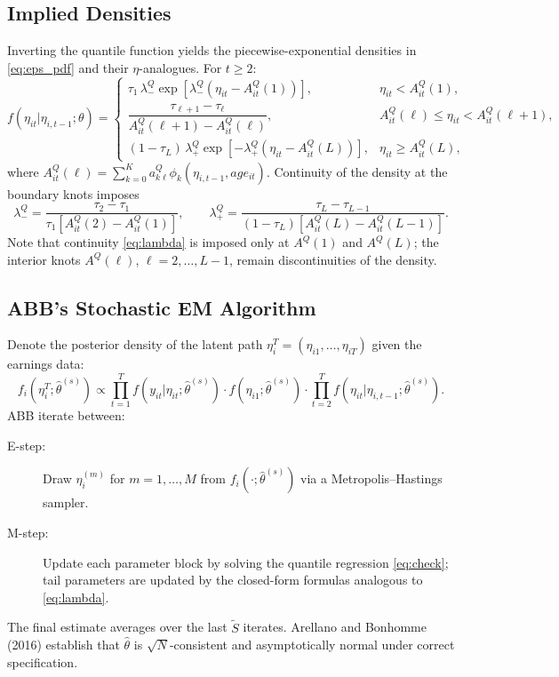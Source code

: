 \documentclass[12pt]{article}
\begin{document}
\subsection{Implied Densities}

Inverting the quantile function yields the piecewise-exponential densities
in \eqref{eq:eps_pdf} and their $\eta$-analogues.
For $t\ge2$:
\begin{equation}\label{eq:eta_pdf}
f(\eta_{it}|\eta_{i,t-1};\theta)=\begin{cases}
\tau_1\,\lambda_-^Q\exp[\lambda_-^Q(\eta_{it}-A^Q_{it}(1))],
  & \eta_{it}<A^Q_{it}(1),\\[4pt]
\dfrac{\tau_{\ell+1}-\tau_\ell}{A^Q_{it}(\ell+1)-A^Q_{it}(\ell)},
  & A^Q_{it}(\ell)\le\eta_{it}<A^Q_{it}(\ell+1),\\[4pt]
(1-\tau_L)\,\lambda_+^Q\exp[-\lambda_+^Q(\eta_{it}-A^Q_{it}(L))],
  & \eta_{it}\ge A^Q_{it}(L),
\end{cases}
\end{equation}
where $A^Q_{it}(\ell)=\sum_{k=0}^K a_{k\ell}^Q\phi_k(\eta_{i,t-1},age_{it})$.
Continuity of the density at the boundary knots imposes
\begin{equation}\label{eq:lambda}
\lambda_-^Q=\frac{\tau_2-\tau_1}{\tau_1[A^Q_{it}(2)-A^Q_{it}(1)]},\qquad
\lambda_+^Q=\frac{\tau_L-\tau_{L-1}}{(1-\tau_L)[A^Q_{it}(L)-A^Q_{it}(L-1)]}.
\end{equation}
Note that continuity \eqref{eq:lambda} is imposed only at $A^Q(1)$ and
$A^Q(L)$; the interior knots $A^Q(\ell)$, $\ell=2,\ldots,L-1$, remain
discontinuities of the density.

\subsection{ABB's Stochastic EM Algorithm}

Denote the posterior density of the latent path $\eta_i^T=(\eta_{i1},\ldots,\eta_{iT})$ given the earnings data:
\begin{equation}
f_i(\eta_i^T;\hat\theta^{(s)})\propto
\prod_{t=1}^T f(y_{it}|\eta_{it};\hat\theta^{(s)})\cdot
f(\eta_{i1};\hat\theta^{(s)})\cdot
\prod_{t=2}^T f(\eta_{it}|\eta_{i,t-1};\hat\theta^{(s)}).
\end{equation}
ABB iterate between:
\begin{description}
\item[E-step:] Draw $\eta_i^{(m)}$ for $m=1,\ldots,M$ from
  $f_i(\cdot;\hat\theta^{(s)})$ via a Metropolis--Hastings sampler.
\item[M-step:] Update each parameter block by solving the quantile regression
  \eqref{eq:check}; tail parameters are updated by the closed-form formulas
  analogous to \eqref{eq:lambda}.
\end{description}
The final estimate averages over the last $\tilde S$ iterates.
Arellano and Bonhomme (2016) establish that $\hat\theta$ is $\sqrt{N}$-consistent
and asymptotically normal under correct specification.
\end{document}
